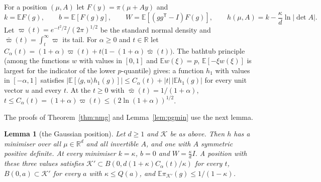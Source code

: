 \documentclass[11pt]{amsart}
\newtheorem{lemma}[theorem]{Lemma}
\theoremstyle{definition}
\numberwithin{equation}{section}
\newcommand{\R}{\mathbb{R}}
\newcommand{\E}{\mathbb{E}}
\newcommand{\cK}{\mathcal{K}}
\newcommand{\ip}[1]{\langle #1\rangle}
\begin{document}
For a position $(\mu,A)$ let $F(y)=\pi(\mu+Ay)$ and
\[
k=\E F(g),\qquad b=\E[F(g)g],\qquad W=\E[(gg^{\mathsf T}-I)F(g)],\qquad h(\mu,A)=k-\frac\kappa d\ln|\det A| .
\]
Let $\varpi(t)=e^{-t^2/2}/(2\pi)^{1/2}$ be the standard normal density and $\bar\varpi(t)=\int_t^\infty\varpi$ its tail. For $\alpha\ge0$ and $t\in\R$ let $C_\alpha(t)=(1+\alpha)\varpi(t)+t\bigl(1-(1+\alpha)\bar\varpi(t)\bigr)$. The bathtub principle (among the functions $w$ with values in $[0,1]$ and $\E w(\xi)=p$, $\E[-\xi w(\xi)]$ is largest for the indicator of the lower $p$-quantile) gives: a function $h_1$ with values in $[-\alpha,1]$ satisfies $|\E[\ip{g,u}h_1(g)]|\le C_\alpha(t)+|t|\,|\E h_1(g)|$ for every unit vector $u$ and every $t$. At the $t\ge0$ with $\bar\varpi(t)=1/(1+\alpha)$, $t\le C_\alpha(t)=(1+\alpha)\varpi(t)\le(2\ln(1+\alpha))^{1/2}$.

The proofs of Theorem~\ref{thm:nmg} and Lemma~\ref{lem:pgmin} use the next lemma.

\begin{lemma}[the Gaussian position]\label{lem:l}
Let $d\ge1$ and $\cK$ be as above. Then $h$ has a minimiser over all $\mu\in\R^d$ and all invertible $A$, and one with $A$ symmetric positive definite. At every minimiser $k=\kappa$, $b=0$ and $W=\frac\kappa dI$. A position with these three values satisfies $\cK'\subset B(0,d(1+\kappa)C_\alpha(t)/\kappa)$ for every $t$, $B(0,a)\subset\cK'$ for every $a$ with $\kappa\le Q(a)$, and $\E\pi_{\cK'}(g)\le1/(1-\kappa)$.
\end{lemma}
\end{document}
